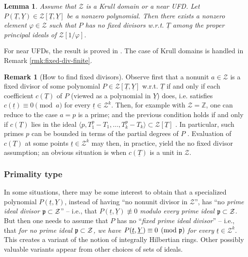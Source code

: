\documentclass[11pt,a4paper,reqno]{amsart}
\newtheorem{lem}[thm]{Lemma}
\theoremstyle{definition}
\newtheorem{rmk}[thm]{Remark}
\begin{document}
\begin{lem} \label{lem:fixed-divisors-removal}
Assume that $\mathcal{Z}$ is a Krull domain or a near UFD. Let $
P(\underline{T},\underline{Y}) \in \mathcal{Z}[\underline{T},\underline{Y}]$ be a nonzero polynomial. Then there exists a nonzero element $\varphi \in \mathcal{Z}$ such that $P$ has no fixed  divisors \hbox{w.r.t.} $\underline{T}$ among the proper principal ideals of $\mathcal{Z}[1/\varphi]$.
\end{lem}

For near UFDs, the result is proved in \cite[\S 4.3.1]{BDKN22}. The case of Krull domains is handled in Remark \ref{rmk:fixed-div-finite}.

\begin{rmk}[How to find fixed divisors]\label{rmk:no-fixed-divisor} 
Observe first that a nonunit $a\in {\mathcal Z}$ is a fixed divisor of some polynomial $P\in {\mathcal Z}[\underline T,\underline Y]$ \hbox{w.r.t.} ${\underline T}$ if and only if each coefficient $c(\underline T)$ of $P$ (viewed as a polynomial in ${\underline Y}$) does, \hbox{i.e.} satisfies $c(\underline t) \equiv 0 \pmod{a}$ for every ${\underline t}\in {\mathcal Z}^k$. Then, for example with ${\mathcal Z} = {\mathbb Z}$, 
one can reduce to the case $a=p$ is a prime; and the previous condition holds if and only if $c(\underline T)$ lies in the ideal $\langle p, T_1^p-T_1,\ldots,T_k^p-T_k \rangle \subset {\mathcal Z}[\underline T]$ \cite[Lemme 1]{terjanian66}. In particular, such primes $p$ can be bounded in terms of the partial degrees of $P$ \cite[\S 3.1]{BDKN22}. Evaluation of $c(\underline{T})$ at some points $\underline t\in {\mathcal Z}^k$ may then, in practice, yield the no fixed divisor assumption; an obvious situation is when $c(\underline{T})$ is a unit in ${\mathcal Z}$. 
\end{rmk}



\subsubsection{Primality type} \label{ssec:primality-typ}
In some situations, 
there may be some interest to obtain that a specialized polynomial $P(\underline t,\underline Y)$, instead of having ``no nonunit divisor in ${\mathcal Z}$'', has ``no \emph{prime ideal divisor} ${\frak p}\subset {\mathcal Z}$'' -- \hbox{i.e.}, that \emph{$P(\underline t,\underline Y)\not\equiv 0$ modulo every prime ideal ${\frak p}\subset {\mathcal Z}$}. But then one needs to assume that $P$ has no ``\emph{fixed prime ideal divisor}'' -- \hbox{i.e.}, that \emph{for no prime ideal ${\frak p}\subset {\mathcal Z}$, we have 
$P(\underline{t},\underline{Y}) \equiv 0 \pmod{{\frak p}}$ for every $\underline{t} \in {\mathcal Z}^k$}. This creates a variant of the notion of integrally Hilbertian rings. Other possibly valuable variants appear from other choices of sets of ideals. 
\vskip 1mm
\end{document}
